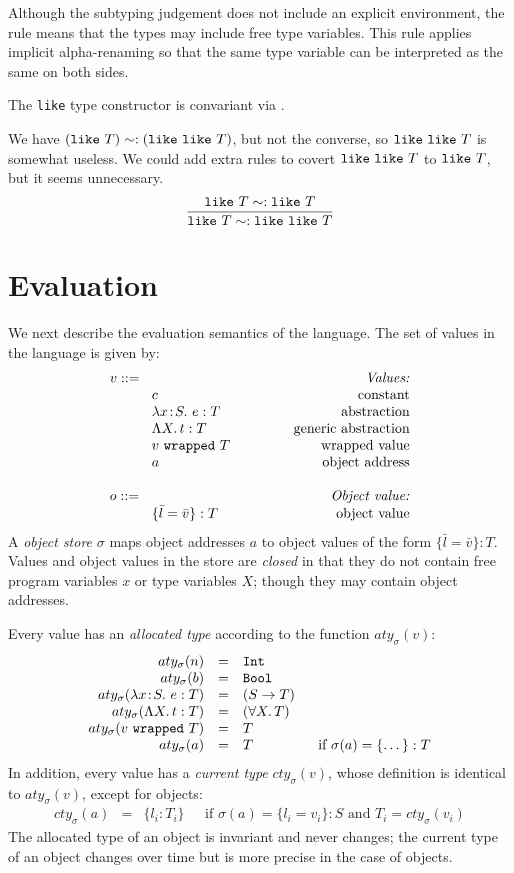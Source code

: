 \documentclass{article}
\newcommand{\lam}[4]{\lambda#1\!:\!#2.\,\,#4:#3}
\newcommand{\lamt}[2]{#1\rightarrow #2}
\newcommand{\Int}{\t{Int}}
\newcommand{\Bool}{\t{Bool}}
\newcommand{\Lam}[3]{\Lambda #1.\,#2:#3}
\newcommand{\Lamt}[2]{\forall #1.\,#2}
\newcommand{\subtype}[2]{#1 \,\sword\, #2}
\renewcommand{\subtype}[2]{\compatible{#1}{#2}}
\newcommand{\sword}{\mbox{\,\,$<:$\,\,}}
\renewcommand{\t}[1]{{\tt #1}}
\newcommand{\objty}[1]{\{#1\}}
\newcommand{\obje}[2]{\{#1\}:{#2}}
\newcommand{\likety}[1]{\t{like}~#1}
\newcommand{\wrapv}[2]{#1~\t{wrapped}~#2}
\newcommand{\compatible}[2]{#1 \sim: #2 }
\newcommand{\allocty}[1]{aty_{\sigma}(#1)}
\newcommand{\curty}[1]{cty_{\sigma}(#1)}
\begin{document}
Although the subtyping judgement does not include an explicit environment, the rule  means that the types may include free type variables. This rule applies implicit alpha-renaming so that the same type variable can be interpreted as the same on both sides.

The \t{like} type constructor is convariant via .
 
 We have $\compatible{({\likety{T}})}{({\likety{\likety{T}}})}$, but not the converse, so ${\likety{\likety{T}}}$ is somewhat useless. We could add extra rules to covert ${\likety{\likety{T}}}$ to $\likety T$, but it seems unnecessary.
\[
	\frac{
			\compatible {\likety T} {\likety T}
		}{
			\subtype {\likety T} {\likety {\likety T}}
		}
\]

\clearpage
\section{Evaluation}

We next describe the evaluation semantics of the language. 
The set of values in the language is given by:
\[
\begin{array}{llr}
	\mydefhead{v ::=\qquad\qquad\qquad\qquad\qquad}{Values:} 
	\mydefcase{c								}{constant} 
	\mydefcase{\lam{x}{S}{T}{e} 				}{abstraction} 
	\mydefcase{\Lam{X}{t}{T}					}{generic abstraction} 
	\mydefcase{\wrapv{v}{T}	 				}{wrapped value} 
	\mydefcase{a								}{object address}
	\\
	\mydefhead{o ::=\qquad\qquad\qquad\qquad\qquad}{Object value:} 
	\mydefcase{\obje{\bar l = \bar v}{T}		}{object value}
\end{array}
\]
A \emph{object store} $\sigma$ maps object addresses $a$ to object values of the form $\obje{\bar{l}=\bar v}{T}$.
Values and object values in the store are \emph{closed} in that they do not contain free program variables $x$ or type variables $X$;
though they may contain object addresses.

Every value has an \emph{allocated type} according to the function $\allocty{v}$:
\[
\begin{array}{rcll}
		\allocty{n}&=&\Int \\
		\allocty{b}&=&\Bool\\
		\allocty{\lam{x}{S}{T}{e}}&=&(\lamt{S}{T})\\
		\allocty{\Lam{X}{t}{T}}&=&(\Lamt{X}{T})\\
		\allocty{\wrapv{v}{T}}&=&T\\
		\allocty{a}&=&T   &\mbox{~~if } 		\sigma(a)=\obje{\dots}{T}
\end{array}
\]
In addition, every value has a \emph{current type} $\curty{v}$, whose definition is identical to $\allocty{v}$, except for objects:
\[
\begin{array}{rcll}
		\curty{a}&=& \objty{l_i:T_i}    &\mbox{~~if  $\sigma(a)=\obje{l_i=v_i}{S}$ and $T_i=\curty{v_i}$}
\end{array}
\]
The allocated type of an object is invariant and never changes; the current type of an object changes over time but is more precise in the case of objects.
\end{document}

